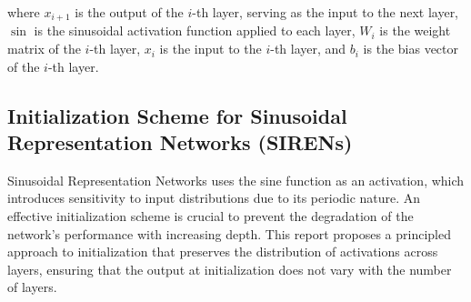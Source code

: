 \documentclass{ioereport}
\begin{document}
    where \( x_{i+1} \) is the output of the \(i\)-th layer, serving as the input to the next layer, \( \sin \) is the sinusoidal activation function applied to each layer, \( W_i \) is the weight matrix of the \(i\)-th layer, \( x_i \) is the input to the \(i\)-th layer, and \( b_i \) is the bias vector of the \(i\)-th layer.
    
    \subsection{Initialization Scheme for Sinusoidal Representation Networks (SIRENs)}
    Sinusoidal Representation Networks uses the sine function as an activation, which introduces sensitivity to input distributions due to its periodic nature. An effective initialization scheme is crucial to prevent the degradation of the network's performance with increasing depth. This report proposes a principled approach to initialization that preserves the distribution of activations across layers, ensuring that the output at initialization does not vary with the number of layers.
\end{document}
